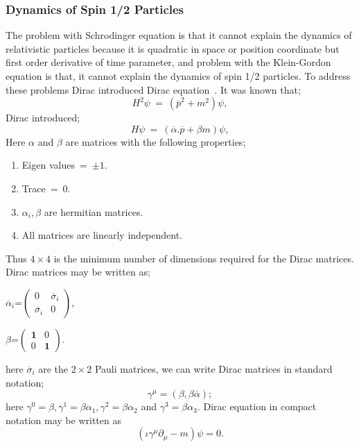 \subsubsection{Dynamics of Spin 1/2 Particles}
The problem with Schrodinger equation is that it cannot explain the dynamics of relativistic particles because it is quadratic in space or position coordinate but first order derivative of time parameter, and problem with the Klein-Gordon equation is that, it cannot explain the dynamics of spin 1/2 particles. To address these problems Dirac introduced Dirac equation~\cite{diracequation}.
It was known that;
\begin{equation}
H^{2}\psi~=~(\overline{p}^{2}+m^{2})\psi,
\end{equation} 
Dirac introduced;
\begin{equation}
H\psi~=~(\overline{\alpha}.\overline{p}+\beta m)\psi,
\end{equation}
Here $\alpha$ and $\beta$ are matrices with the following properties;
\begin{enumerate}
\item Eigen values~=~$\pm1$.
\item Trace~=~0.
\item$\alpha_{i},\beta$ are hermitian matrices.
\item All matrices are linearly independent.
\end{enumerate}
Thus $4\times4$ is the minimum number of  dimensions required for the Dirac matrices. Dirac matrices may be written as;
\begin{center}
$\overline{\alpha}_{i}$=$\begin{pmatrix}
0 & \overline{\sigma}_{i}\\
\overline{\sigma}_{i} & 0

\end{pmatrix}$,\\
\end{center}
\begin{center}
$\beta$=$\begin{pmatrix}
\mathbf{1} & 0\\
0 & \mathbf{1}
\end{pmatrix}.$
\end{center}
here $\overline{\sigma}_{i}$ are the $2\times 2$ Pauli matrices, we can write Dirac matrices in standard notation;
\begin{equation}
\gamma^{\mu}=(\beta,\beta\overline{\alpha});
\end{equation}
here $\gamma^{0}=\beta,\gamma^{1}=\beta\alpha_{1},\gamma^{2}=\beta\alpha_{2}$ and $\gamma^{3}=\beta\alpha_{3}$.
Dirac equation in compact notation may be written as
\begin{equation}\label{Dirac equation}
(\iota\gamma^{\mu}\partial_{\mu}-m)\psi=0.
\end{equation}
